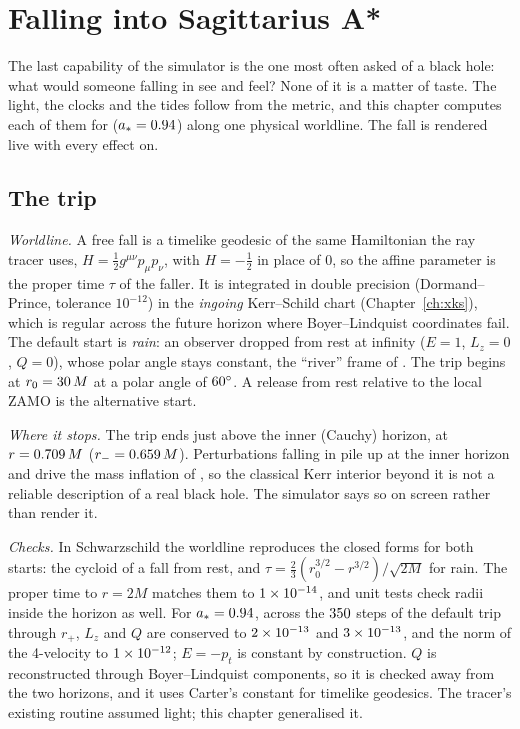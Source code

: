 \chapter{Falling into Sagittarius A*}
\label{ch:xinfall}

The last capability of the simulator is the one most often asked of a black
hole: what would someone falling in see and feel? None of it is a matter of
taste. The light, the clocks and the tides follow from the metric, and this
chapter computes each of them for \sgra{} ($a_* = 0.94$) along one
physical worldline. The fall is rendered live with every effect on.

\section{The trip}

\emph{Worldline.} A free fall is a timelike geodesic of the same Hamiltonian
the ray tracer uses, $H = \frac12 g^{\mu\nu} p_\mu p_\nu$, with $H = -\frac12$
in place of 0, so the affine parameter is the proper time $\tau$ of the
faller. It is integrated in double precision (Dormand--Prince, tolerance
$10^{-12}$) in the \emph{ingoing} Kerr--Schild chart (Chapter~\ref{ch:xks}),
which is regular across the future horizon where Boyer--Lindquist
coordinates fail. The default start is \emph{rain}: an observer dropped from
rest at infinity ($E = 1$, $L_z = 0$, $Q = 0$), whose polar angle stays
constant, the ``river'' frame of \citet{HamiltonLisle2008}. The trip begins at
$r_0 = 30\,M$ at a polar angle of $60^\circ$. A release
from rest relative to the local ZAMO is the alternative start.

\emph{Where it stops.} The trip ends just above the inner (Cauchy) horizon,
at $r = 0.709\,M$ ($r_- = 0.659\,M$). Perturbations falling in pile
up at the inner horizon and drive the mass inflation of
\citet{PoissonIsrael1990}, so the classical Kerr interior beyond it is not a
reliable description of a real black hole. The simulator says so on screen
rather than render it.

\emph{Checks.} In Schwarzschild the worldline reproduces the closed forms for
both starts: the cycloid of a fall from rest, and
$\tau = \frac23 (r_0^{3/2} - r^{3/2})/\sqrt{2M}$ for rain. The proper time to
$r = 2M$ matches them to $1\times10^{-14}$, and unit tests check radii inside the
horizon as well. For $a_* = 0.94$, across the $350$ steps of the
default trip through $r_+$, $L_z$ and $Q$ are conserved to $2\times10^{-13}$ and
$3\times10^{-13}$, and the norm of the 4-velocity to $1\times10^{-12}$; $E = -p_t$ is
constant by construction. $Q$ is reconstructed through Boyer--Lindquist
components, so it is checked away from the two horizons, and it uses Carter's
constant for timelike geodesics. The tracer's existing routine assumed light;
this chapter generalised it.

